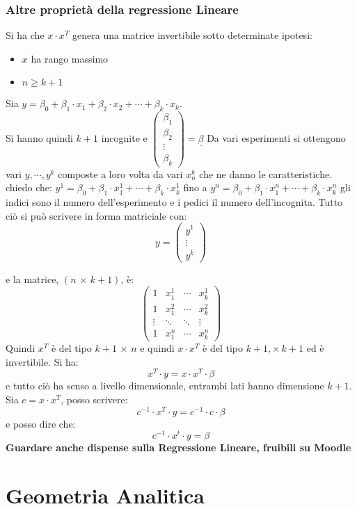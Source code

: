 \documentclass[a4paper,12pt, oneside]{book}
\begin{document}
\subsection{Altre proprietà della regressione Lineare}
Si ha che $x\cdot x^T$ genera una matrice invertibile sotto determinate ipotesi:
\begin{itemize}
\item $x$ ha rango massimo 
\item $n\geq k+1$
\end{itemize}
Sia $y=\beta_0+\beta_1\cdot x_1+\beta_2\cdot x_2+\cdots+\beta_k\cdot x_k$.\\ Si hanno quindi $k+1$ incognite e $
\left(\begin{matrix}
\beta_1\\
\beta_2\\
\vdots\\
\beta_k
\end{matrix}\right)=\underline{\beta}
$
Da vari esperimenti si ottengono vari $y,\cdots, y^k$ composte a loro volta da vari $x^k_n$ che ne danno le caratteristiche.\\
chiedo che: $y^1=\beta_0+\beta_1\cdot x^1_1+\cdots+\beta_k\cdot x^1_k$
fino a $y^n=\beta_0+\beta_1\cdot x^n_1+\cdots+\beta_k\cdot x^n_k$
gli indici sono il numero dell'esperimento e i pedici il numero dell'incognita. Tutto ciò si può scrivere in forma matriciale con:
$$
y=\left(\begin{matrix}
y^1\\
\vdots\\
y^k
\end{matrix}\right)
$$

e la matrice, $(n\,\times\, k+1)$, è:
$$
\left(\begin{matrix}
1 & x_1^1 & \cdots & x_k^1\\
1 & x_1^2 & \cdots & x_k^2\\
\vdots & \ddots & \ddots & \vdots\\
1 & x_1^n & \cdots & x_k^n
\end{matrix}\right)
$$
Quindi $x^T$ è del tipo $k+1\,\times\, n$ e quindi $x\cdot x^T$ è del tipo $k+1,\times\, k+1$ ed è invertibile.
Si ha: $$x^T\cdot y = x\cdot x^T\cdot \beta$$
e tutto ciò ha senso a livello dimensionale, entrambi lati hanno dimensione $k+1$. Sia $c=x\cdot x^T$, posso scrivere: $$c^{-1}\cdot x^T\cdot y=c^{-1}\cdot c\cdot \beta$$ e posso dire che: $$c^{-1}\cdot x^t\cdot y=\beta$$
\textbf{Guardare anche dispense sulla Regressione Lineare, fruibili su Moodle}
\chapter{Geometria Analitica}
\end{document}
